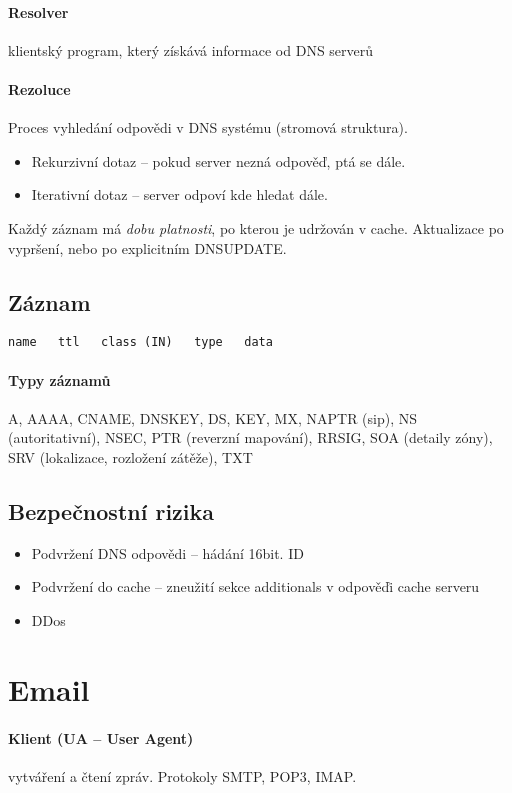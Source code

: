 \documentclass[a4paper, 11pt]{report}
\begin{document}
\paragraph{Resolver}
klientský program, který získává informace od DNS serverů

\paragraph{Rezoluce}
Proces vyhledání odpovědi v DNS systému (stromová struktura).
\begin{itemize}
	\item Rekurzivní dotaz -- pokud server nezná odpověď, ptá se dále.
	\item Iterativní dotaz -- server odpoví kde hledat dále.
\end{itemize}

Každý záznam má \emph{dobu platnosti}, po kterou je udržován v cache. Aktualizace po vypršení, nebo po explicitním DNSUPDATE.

\subsection{Záznam}

\verb|name   ttl   class (IN)   type   data|

\paragraph{Typy záznamů}
A, AAAA, CNAME, DNSKEY, DS, KEY, MX, NAPTR (sip), NS (autoritativní), NSEC, PTR (reverzní mapování), RRSIG, SOA (detaily zóny), SRV (lokalizace, rozložení zátěže), TXT

\subsection{Bezpečnostní rizika}
\begin{itemize}
	\item Podvržení DNS odpovědi -- hádání 16bit. ID
	\item Podvržení do cache -- zneužití sekce additionals v odpověďi cache serveru
	\item DDos
\end{itemize}


\section{Email}

\paragraph{Klient (UA -- User Agent)} vytváření a čtení zpráv. Protokoly SMTP, POP3, IMAP.
\end{document}
